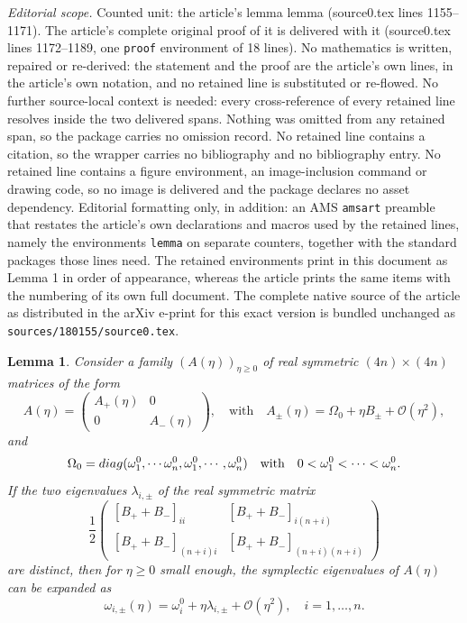 \documentclass[10pt,a4paper]{amsart}
\newtheorem{lemma}{Lemma}
\begin{document}
\noindent\textit{Editorial scope.} Counted unit: the article's lemma lemma (source0.tex lines 1155--1171). The article's complete original proof of it is delivered with it (source0.tex lines 1172--1189, one \texttt{proof} environment of 18 lines). No mathematics is written, repaired or re-derived: the statement and the proof are the article's own lines, in the article's own notation, and no retained line is substituted or re-flowed.  No further source-local context is needed: every cross-reference of every retained line resolves inside the two delivered spans.  Nothing was omitted from any retained span, so the package carries no omission record.  No retained line contains a citation, so the wrapper carries no bibliography and no bibliography entry.  No retained line contains a figure environment, an image-inclusion command or drawing code, so no image is delivered and the package declares no asset dependency.  Editorial formatting only, in addition: an AMS \texttt{amsart} preamble that restates the article's own declarations and macros used by the retained lines, namely the environments \texttt{lemma} on separate counters, together with the standard packages those lines need.  The retained environments print in this document as Lemma 1 in order of appearance, whereas the article prints the same items with the numbering of its own full document.  The complete native source of the article as distributed in the arXiv e-print for this exact version is bundled unchanged as \texttt{sources/180155/source0.tex}.
\begin{lemma}
    Consider a family $(A(\eta))_{\eta \ge 0}$ of real symmetric $(4n) \times (4n)$ matrices of the form
    $$
A(\eta) = \left( \begin{array}{cc} A_+(\eta) & 0 \\ 0 & A_-(\eta) \end{array} \right), \quad \mbox{with} \quad A_\pm(\eta)=\Omega_0 + \eta B_\pm + \mathcal O(\eta^2), 
    $$
    and 
    $$
    \Omega_0 = {\rm diag}(\omega_1^0,\cdots \omega_n^0,\omega_1^0,\cdots,\omega_n^0) \quad \mbox{with} \quad 0 < \omega_1^0 < \cdots < \omega_n^0 .
    $$
    If the two eigenvalues $\lambda_{i,\pm}$ of the real symmetric matrix
    $$\frac12\begin{pmatrix}
        [B_++B_-]_{ii} & [B_++B_-]_{i(n+i)}\\
        [B_++B_-]_{(n+i)i} & [B_++B_-]_{(n+i)(n+i)}
    \end{pmatrix}$$
    are distinct, then for $\eta \ge 0$ small enough, the symplectic eigenvalues of $A(\eta)$ can be expanded as
    $$\omega_{i,\pm}(\eta)=\omega_i^0+\eta\lambda_{i,\pm}+\mathcal O(\eta^2),\quad i=1,\ldots,n.$$
\end{lemma}
\end{document}
